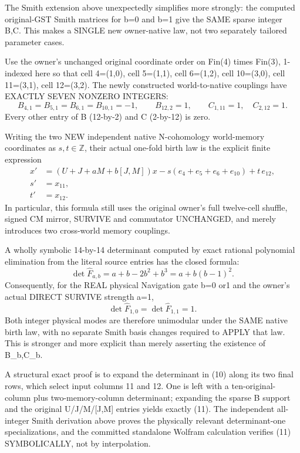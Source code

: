 \documentclass[11pt]{article}
\begin{document}
The Smith extension above unexpectedly simplifies more strongly:
the computed original-GST Smith matrices for b=0 and b=1
give the SAME sparse integer B,C.
This makes a SINGLE new owner-native law,
not two separately tailored parameter cases.

Use the owner's unchanged original coordinate
order on Fin(4) times Fin(3), 1-indexed here
so that cell 4=(1,0), cell 5=(1,1),
cell 6=(1,2), cell 10=(3,0),
cell 11=(3,1), cell 12=(3,2).
The newly constructed world-to-native couplings
have EXACTLY SEVEN NONZERO INTEGERS:
\[
 B_{4,1}=B_{5,1}=B_{6,1}=B_{10,1}=-1,
 \qquad B_{12,2}=1,\qquad
 C_{1,11}=1,\quad C_{2,12}=1.
\]
Every other entry of B (12-by-2) and
C (2-by-12) is zero.

Writing the two NEW independent native
N-cohomology world-memory coordinates as
\(s,t\in\mathbb Z\), their actual one-fold
birth law is the explicit finite expression
\[
\boxed{
\begin{aligned}
x'&= (U+J+aM+b[J,M])x
 -s(e_4+e_5+e_6+e_{10})+t\,e_{12},\\
s'&=x_{11},\\
t'&=x_{12}.
\end{aligned}}\tag{10}
\]
In particular, this formula still uses the
original owner's full twelve-cell shuffle,
signed CM mirror, SURVIVE and commutator
UNCHANGED, and merely introduces two
cross-world memory couplings.

A wholly symbolic 14-by-14 determinant
computed by exact rational polynomial
elimination from the literal source entries
has the closed formula:
\[
\boxed{
\det\widehat F_{a,b}
=a+b-2b^2+b^3
=a+b(b-1)^2.
}\tag{11}
\]
Consequently, for the REAL physical Navigation
gate b=0 or1 and the owner's actual DIRECT
SURVIVE strength a=1,
\[
\boxed{\det\widehat F_{1,0}
=\det\widehat F_{1,1}=1.}
\]
Both integer physical modes are therefore
unimodular under the SAME native birth law,
with no separate Smith basis changes required
to APPLY that law.
This is stronger and more explicit than
merely asserting the existence of B_b,C_b.

A structural exact proof is to expand the
determinant in (10) along its two final rows,
which select input columns 11 and 12.
One is left with a ten-original-column plus
two-memory-column determinant; expanding
the sparse B support and the original
U/J/M/[J,M] entries yields exactly
(11). The independent all-integer Smith
derivation above proves the physically
relevant determinant-one specializations,
and the committed standalone Wolfram
calculation verifies (11) SYMBOLICALLY,
not by interpolation.
\end{document}
